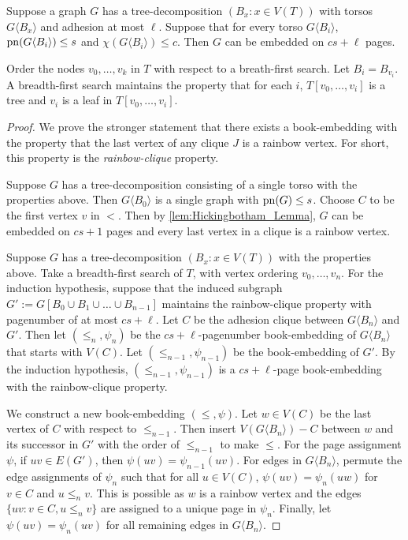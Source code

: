 \begin{theorem}
	Suppose a graph \(G\) has a tree-decomposition \((B_x: x \in V(T))\) with torsos \(G \langle B_x \rangle\) and adhesion at most \(\ell\). Suppose that for every torso $G\langle B_i \rangle$, \(\operatorname{pn}(G\langle B_i \rangle) \leq s\) and \(\chi(G\langle B_i \rangle) \leq c\). Then \(G\) can be embedded on \(cs + \ell\) pages.
\end{theorem}
Order the nodes \(v_0, \ldots, v_k\) in $T$ with respect to a breath-first search. Let $B_i = B_{v_i}$. 
A breadth-first search maintains the property that for each \(i\), \(T[v_0, \ldots, v_{i}]\) is a tree and \(v_i\) is a leaf in \(T[v_0, \ldots, v_{i}]\).
\begin{proof}
	We prove the stronger statement that there exists a book-embedding with the property that the last vertex of any clique \(J\) is a rainbow vertex. For short, this property is the \textit{rainbow-clique} property. 

	Suppose $G$ has a tree-decomposition consisting of a single torso with the properties above. Then \(G\langle B_0 \rangle\) is a single graph with \(\operatorname{pn}(G) \leq s\). Choose \(C\) to be the first vertex \(v\) in \( < \). Then by \cref{lem:Hickingbotham_Lemma}, $G$ can be embedded on \(cs + 1\) pages and every last vertex in a clique is a rainbow vertex.

	Suppose $G$ has a tree-decomposition $(B_x: x \in V(T))$ with the properties above. Take a breadth-first search of $T$, with vertex ordering $v_0, \ldots, v_n$. For the induction hypothesis, suppose that the induced subgraph $G' := G[B_0 \cup B_1 \cup \ldots \cup B_{n-1}]$ maintains the rainbow-clique property with pagenumber of at most \(cs + \ell\).  
	Let \(C\) be the adhesion clique between \(G \langle B_n \rangle\) and $G'$. Then let \((\leq_n, \psi_n)\) be the \(cs + \ell\)-pagenumber book-embedding of \(G \langle B_n \rangle\) that starts with \(V(C)\). Let \((\leq_{n-1}, \psi_{n-1})\) be the book-embedding of \(G'\). By the induction hypothesis, \((\leq_{n-1}, \psi_{n-1})\) is a \(cs + \ell\)-page book-embedding with the rainbow-clique property.

	We construct a new book-embedding \((\leq, \psi)\).
	Let \(w \in V(C)\) be the last vertex of \(C\) with respect to \(\leq_{n-1}\). Then insert \(V(G \langle B_n \rangle) - C\) between \(w\) and its successor in $G'$ with the order of \(\leq_{n-1}\) to make $\leq$. For the page assignment \(\psi\), if \(uv \in E(G')\), then \(\psi(uv) = \psi_{n-1}(uv)\). For edges in $G \langle B_n \rangle$, permute the edge assignments of \(\psi_n\) such that for all \(u \in V(C)\), \(\psi(uv) = \psi_n(uw)\) for $v \in C$ and $u \leq_n v$. This is possible as \(w\) is a rainbow vertex and the edges \(\{uv : v \in C, u \leq_n v\}\) are assigned to a unique page in \(\psi_n\). Finally, let \(\psi(uv) = \psi_n(uv)\) for all remaining edges in $G \langle B_n \rangle$. 


\end{proof}
